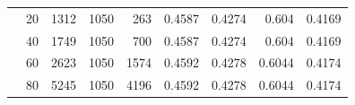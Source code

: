 \documentclass[a4paper]{llncs}
\begin{document}
\begin{table}[htbp!]
{\begin{tabular}{crrrrrrrr}
                                & 20                            & 1312                      & 1050                     & 263                        & 0.4587                     & 0.4274                        & 0.604                   & 0.4169                 \\
                                & 40                            & 1749                      & 1050                     & 700                        & 0.4587                     & 0.4274                        & 0.604                   & 0.4169                 \\
                                & 60                            & 2623                      & 1050                     & 1574                       & 0.4592                     & 0.4278                        & 0.6044                  & 0.4174                 \\
                                & 80                            & 5245                      & 1050                     & 4196                       & 0.4592                     & 0.4278                        & 0.6044                  & 0.4174                 \\ \hline
\end{tabular}%
}
\end{table}
\end{document}
